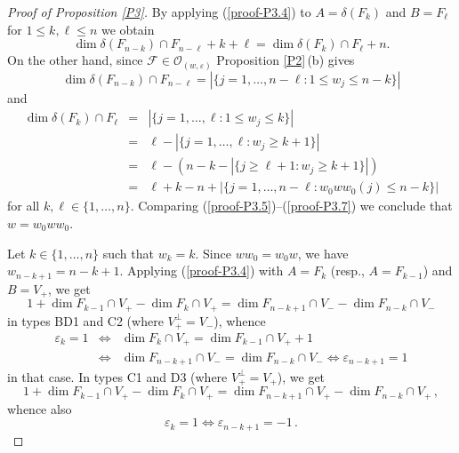 \documentclass{amsart}
\theoremstyle{definition}
\begin{document}
\begin{proof}[Proof of Proposition \ref{P3}]
By applying (\ref{proof-P3.4}) to $A=\delta\left( F_k\right)$ and $B=F_\ell$ for $1\leq k,\ell\leq n$ we obtain
\begin{equation}
\label{proof-P3.5}
\dim \delta\left( F_{n-k}\right)\cap F_{n-\ell}+k+\ell=\dim \delta \left(F_k\right)\cap F_\ell+n.
\end{equation}
On the other hand, since $\mathcal{F}\in\mathcal{O}_{(w,\varepsilon)}$ Proposition \ref{P2}\,{\rm (b)} gives
\begin{equation}
\label{proof-P3.6}
\dim \delta\left( F_{n-k}\right)\cap F_{n-\ell}=|\{j=1,\ldots,n-\ell:1\leq w_j\leq n-k\}|
\end{equation}
and
\begin{eqnarray}
\label{proof-P3.7}
\dim\delta \left(F_k\right)\cap F_\ell & = & |\{j=1,\ldots,\ell:1\leq w_j\leq k\}| \\
\nonumber & = & \ell-|\{j=1,\ldots,\ell:w_j\geq k+1\}| \\
\nonumber & = & \ell-(n-k-|\{j\geq \ell+1:w_j\geq k+1\}|) \\
\nonumber & = & \ell+k-n+|\{j=1,\ldots,n-\ell:w_0ww_0(j)\leq n-k\}|
\end{eqnarray}
for all $k,\ell\in\{1,\ldots,n\}$. Comparing (\ref{proof-P3.5})--(\ref{proof-P3.7}) we conclude that $w=w_0ww_0$.

Let $k\in\{1,\ldots,n\}$ such that $w_k=k$. Since $ww_0=w_0w$, we have $w_{n-k+1}=n-k+1$.
Applying (\ref{proof-P3.4}) with $A=F_k$ (resp., $A=F_{k-1}$) and $B=V_+$, we get
\[1+\dim F_{k-1}\cap V_+-\dim F_k\cap V_+=\dim F_{n-k+1}\cap V_--\dim F_{n-k}\cap V_-\]
in types BD1 and C2 (where $V_+^\perp=V_-$), whence
\begin{eqnarray*}
\varepsilon_k=1 & \Leftrightarrow &  \dim F_k\cap V_+=\dim F_{k-1}\cap V_++1 \\
 & \Leftrightarrow &  \dim F_{n-k+1}\cap V_-=\dim F_{n-k}\cap V_-\Leftrightarrow\varepsilon_{n-k+1}=1
\end{eqnarray*}
in that case.  In types C1 and D3  (where $V_+^\perp=V_+$), we get
\[1+\dim F_{k-1}\cap V_+-\dim F_k\cap V_+=\dim F_{n-k+1}\cap V_+-\dim F_{n-k}\cap V_+\,,\]
whence also
\[\varepsilon_k=1\Leftrightarrow \varepsilon_{n-k+1}=-1\,.\] 


\end{proof}
\end{document}
